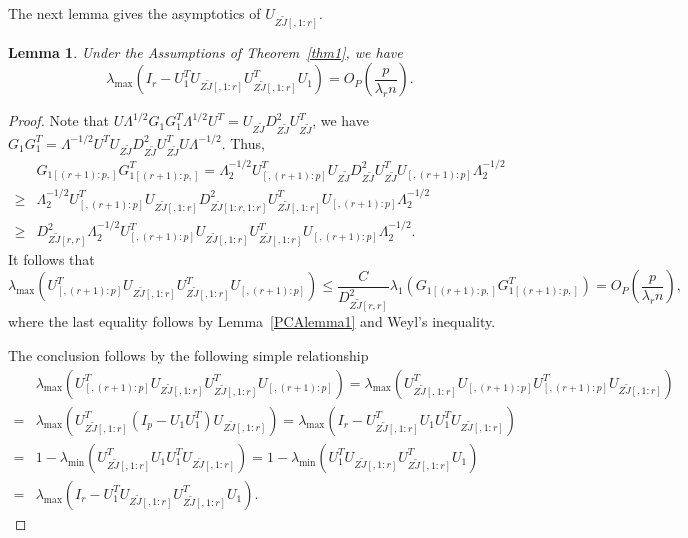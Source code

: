 \documentclass[12pt]{article} %
\newtheorem{lemma}{Lemma}
\theoremstyle{definition}
\begin{document}
The next lemma gives the asymptotics of $U_{Z\tilde{J}[,1:r]}$.
\begin{lemma}\label{PCAlemma2}
    Under the Assumptions of Theorem~\ref{thm1}, we have
$$
\lambda_{\max}(I_r-U_1^T U_{Z\tilde{J}[,1:r]}U_{Z\tilde{J}[,1:r]}^T U_1)
=O_P(\frac{ p}{\lambda_r n}).
$$
\end{lemma}
\begin{proof}
    Note that
$
U\Lambda^{1/2} G_1 G_1^T \Lambda^{1/2} U^T 
=U_{Z\tilde{J}}D_{Z\tilde{J}}^2 U_{Z\tilde{J}}^T
$,
we have
$
G_1 G_1^T  
=\Lambda^{-1/2} U^T U_{Z\tilde{J}}D_{Z\tilde{J}}^2 U_{Z\tilde{J}}^TU\Lambda^{-1/2}
$. Thus,
$$
\begin{aligned}
&G_{1[(r+1):p,]} G_{1[(r+1):p,]}^T  
=\Lambda_{2}^{-1/2} U_{[,(r+1):p]}^T U_{Z\tilde{J}}D_{Z\tilde{J}}^2 U_{Z\tilde{J}}^T U_{[,(r+1):p]}\Lambda_{2}^{-1/2}\\
\geq&
\Lambda_{2}^{-1/2} U_{[,(r+1):p]}^T U_{Z\tilde{J}[,1:r]}D_{Z\tilde{J}[1:r,1:r]}^2 U_{Z\tilde{J}[,1:r]}^T U_{[,(r+1):p]}\Lambda_{2}^{-1/2}\\
\geq&
D_{Z\tilde{J}[r,r]}^2
\Lambda_{2}^{-1/2} U_{[,(r+1):p]}^T U_{Z\tilde{J}[,1:r]} U_{Z\tilde{J}[,1:r]}^T U_{[,(r+1):p]}\Lambda_{2}^{-1/2}.
\end{aligned}
$$
It follows that
$$
\lambda_{\max}(U_{[,(r+1):p]}^T U_{Z\tilde{J}[,1:r]} U_{Z\tilde{J}[,1:r]}^T U_{[,(r+1):p]})\leq
\frac{C}{D^2_{Z\tilde{J}[r,r]}} \lambda_{1}
(G_{1[(r+1):p,]} G_{1[(r+1):p,]}^T)
=O_P(\frac{p}{\lambda_r n}),
$$
    where the last equality follows by Lemma~\ref{PCAlemma1} and Weyl's inequality.

 The conclusion follows by the following simple relationship
$$
\begin{aligned}
&\lambda_{\max}(U_{[,(r+1):p]}^T U_{Z\tilde{J}[,1:r]} U_{Z\tilde{J}[,1:r]}^T U_{[,(r+1):p]})
=
\lambda_{\max}( U_{Z\tilde{J}[,1:r]}^T U_{[,(r+1):p]}U_{[,(r+1):p]}^T U_{Z\tilde{J}[,1:r]})\\
=&
\lambda_{\max}( U_{Z\tilde{J}[,1:r]}^T (I_p- U_1 U_1^T) U_{Z\tilde{J}[,1:r]})=
\lambda_{\max}(I_r- U_{Z\tilde{J}[,1:r]}^T  U_1 U_1^T U_{Z\tilde{J}[,1:r]})\\
=&
1-\lambda_{\min}( U_{Z\tilde{J}[,1:r]}^T  U_1 U_1^T U_{Z\tilde{J}[,1:r]})
=
1-\lambda_{\min}(U_1^T U_{Z\tilde{J}[,1:r]}U_{Z\tilde{J}[,1:r]}^T U_1)\\
=&
\lambda_{\max}(I_r-U_1^T U_{Z\tilde{J}[,1:r]}U_{Z\tilde{J}[,1:r]}^T U_1).
\end{aligned}
$$
\end{proof}
\end{document}

